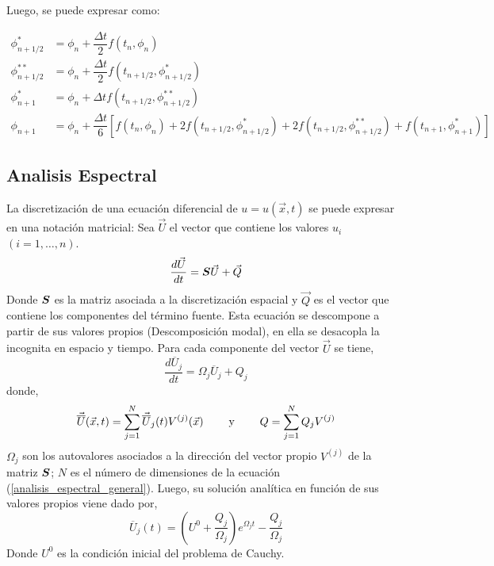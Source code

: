 Luego, se puede expresar como:

\begin{align}
\phi^*_{n+1/2} &= \phi_n + \dfrac{\Delta t}{2} f(t_n,\phi_n)\\
\phi^{**}_{n+1/2} &= \phi_n + \dfrac{\Delta t}{2} f(t_{n+1/2},\phi^*_{n+1/2})\\
\phi^*_{n+1} &= \phi_n + \Delta t f(t_{n+1/2},\phi^{**}_{n+1/2})\\
\phi_{n+1} &= \phi_n + \dfrac{\Delta t}{6} \left[ f(t_n,\phi_n) + 2 f(t_{n+1/2},\phi^*_{n+1/2}) + 2 f(t_{n+1/2},\phi^{**}_{n+1/2}) + f(t_{n+1},\phi^*_{n+1}) \right] 
\end{align}

\subsection{Analisis Espectral} \label{analisis_espectral_seccion}
La discretización de una ecuación diferencial de $u=u(\vec{x},t)$ se puede expresar en una notación matricial: Sea $\vec{U}$ el vector que contiene los valores $u_i$ $ (i=1, \ldots ,n)$.
\begin{equation} \label{analisis_espectral_general}
\dfrac{d \vec{U}}{d t} = \boldsymbol{S} \vec{U} + \vec{Q}
\end{equation}
Donde $\boldsymbol{S}$ es la matriz asociada a la discretización espacial y $\vec{Q}$ es el vector que contiene los componentes del término fuente. Esta ecuación se descompone a partir de sus valores propios (Descomposición modal), en ella se desacopla la incognita en espacio y tiempo. Para cada componente del vector $\vec{U}$ se tiene,
\begin{equation} \label{analisis_espectral_descompuesto}
\dfrac{d \overline{U}_j}{d t} = \Omega_j \overline{U}_j + Q_j
\end{equation}
donde,
\begin{equation}
\vec{\overline{U}}(\vec{x},t) = \sum_{j=1}^N \vec{\overline{U}}_j(t) V^{(j)}(\vec{x})
\hspace{0,8cm} \mbox{y} \hspace{0,8cm}
Q = \sum_{j=1}^N Q_j V^{(j)}
\end{equation}
$\Omega_j$ son los autovalores asociados a la dirección del vector propio $V^{(j)}$ de la matriz $\boldsymbol{S}$; $N$ es el número de dimensiones de la ecuación (\ref{analisis_espectral_general}). Luego, su solución analítica en función de sus valores propios viene dado por,
\begin{equation}
\overline{U}_j(t) = \left( U^0 + \dfrac{Q_j}{\Omega_j} \right) e^{\Omega_j t} - \dfrac{Q_j}{\Omega_j}
\end{equation}
Donde $U^0$ es la condición inicial del problema de Cauchy. 

